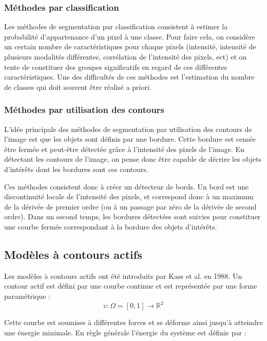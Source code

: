 \subsubsection*{Méthodes par classification}
Les méthodes de segmentation par classification consistent à estimer la probabilité d'appartenance d'un pixel à une classe. Pour faire cela, on considère un certain nombre de caractéristiques pour chaque pixels (intensité, intensité de plusieurs modalités différentes, corrélation de l'intensité des pixels, ect) et on tente de constituer des groupes significatifs en regard de ces différentes caractéristiques. Une des difficultés de ces méthodes est l'estimation du nombre de classes qui doit souvent être réalisé a priori.


\subsubsection*{Méthodes par utilisation des contours}

L'idée principale des méthodes de segmentation par utilisation des contours de l'image est que les objets sont définis par une bordure. Cette bordure est censée être fermée et peut-être détectée grâce à l'intensité des pixels de l'image. En détectant les contours de l'image, on pense donc être capable de décrire les objets d'intérêts dont les bordures sont ces contours.

Ces méthodes consistent donc à créer un détecteur de bords. Un bord est une discontinuité locale de l'intensité des pixels, et correspond donc à un maximum de la dérivée de premier ordre (ou à un passage par zéro de la dérivée de second ordre). Dans un second temps, les bordures détectées sont suivies pour constituer une courbe fermée correspondant à la bordure des objets d'intérêts.




\subsection{Modèles à contours actifs}

Les modèles à contours actifs ont été introduits par Kass et al. en 1988. Un contour actif est défini par une courbe continue et est représentée par une forme paramétrique :
\begin{equation*}
v:\Omega=[0,1] \rightarrow \mathbb{R}^2
\end{equation*}

Cette courbe est soumises à différentes forces et se déforme ainsi jusqu'à atteindre une énergie minimale. En règle générale l'énergie du système est définie par : 

